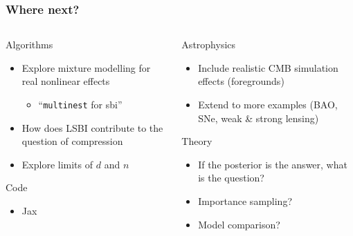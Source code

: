 \documentclass[aspectratio=169]{beamer}
\begin{document}
\begin{frame}
    \frametitle{Where next?}
    \begin{columns}
        \begin{column}{0.45\textwidth}
            \begin{block}{Algorithms}
                \begin{itemize}
        \item Explore mixture modelling for real nonlinear effects
            \begin{itemize}
                \item ``\texttt{multinest} for sbi''
            \end{itemize}
        \item How does LSBI contribute to the question of compression
        \item Explore limits of $d$ and $n$
                \end{itemize}
            \end{block}
    \begin{block}{Code}
        \begin{itemize}
            \item Jax
        \end{itemize}
    \end{block}
        \end{column}
        \begin{column}{0.45\textwidth}
            \begin{block}{Astrophysics}
                \begin{itemize}
        \item Include realistic CMB simulation effects (foregrounds)
        \item Extend to more examples (BAO, SNe, weak \& strong lensing)
    \end{itemize}
            \end{block}
            \begin{block}{Theory}
                \begin{itemize}
                    \item If the posterior is the answer, what is the question?
                    \item Importance sampling?
                    \item Model comparison?
                \end{itemize}
            \end{block}
            
        \end{column}
    \end{columns}
                

\end{frame}
\end{document}
